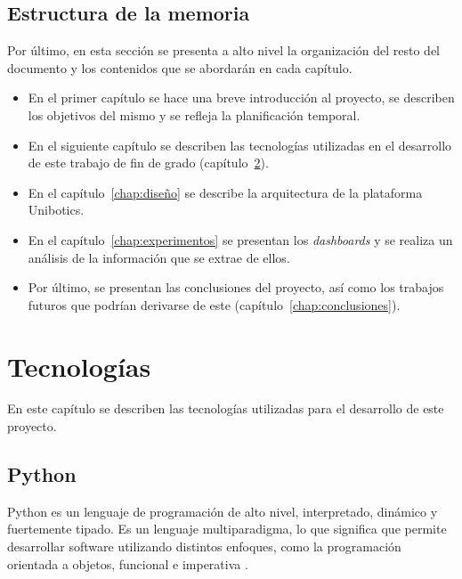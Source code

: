 \documentclass[a4paper, 12pt]{book}
\begin{document}
\section{Estructura de la memoria}
\label{sec:estructura}

Por último, en esta sección se presenta a alto nivel la organización del resto del documento y los contenidos que se abordarán en cada capítulo.

\begin{itemize}
  \item En el primer capítulo se hace una breve introducción al proyecto, se describen los objetivos del mismo y se refleja la planificación temporal.
  \item En el siguiente capítulo se describen las tecnologías utilizadas en el desarrollo de este trabajo de fin de grado (capítulo~\ref{chap:tecnologias}).
  \item En el capítulo~\ref{chap:diseño} se describe la arquitectura de la plataforma Unibotics.
  \item En el capítulo~\ref{chap:experimentos} se presentan los \textit{dashboards} y se realiza un análisis de la información que se extrae de ellos.
  \item Por último, se presentan las conclusiones del proyecto, así como los trabajos futuros que podrían derivarse de este (capítulo~\ref{chap:conclusiones}).
\end{itemize}

\cleardoublepage


\chapter{Tecnologías}               %
\label{chap:tecnologias}

En este capítulo se describen las tecnologías utilizadas para el desarrollo de este proyecto.

\section{Python}
\label{sec:python}

Python es un lenguaje de programación de alto nivel, interpretado, dinámico y fuertemente tipado. Es un lenguaje multiparadigma, lo que significa que permite desarrollar software utilizando distintos enfoques, como la programación orientada a objetos, funcional e imperativa \cite{intropython}.
\end{document}
